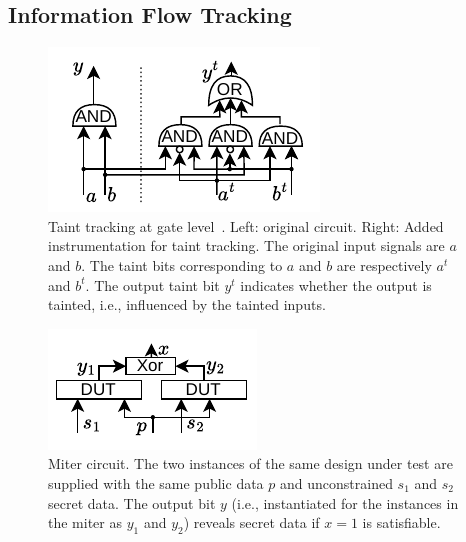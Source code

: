 \subsection{Information Flow Tracking}
\label{subsec:ift}

\begin{figure}[t]
    \begin{center}
    \includegraphics[width=0.5\columnwidth]{figures/glift/glift.pdf}
    \end{center}
    \vspace*{-1em}
    \caption{\label{fig:glift} Taint tracking at gate level~\cite{tiwari2009complete}. Left: original circuit. Right: Added instrumentation for taint tracking. The original input signals are $a$ and $b$. The taint bits corresponding to $a$ and $b$ are respectively $a^t$ and $b^t$. The output taint bit $y^t$ indicates whether the output is tainted, i.e., influenced by the tainted inputs.}
    \vspace*{-1em}
\end{figure}

\begin{figure}[t]
    \begin{center}
    \includegraphics[width=0.5\columnwidth]{figures/miter/miter.pdf}
    \end{center}
    \vspace*{-2em}
    \caption{\label{fig:miter} Miter circuit. The two instances of the same design under test are supplied with the same public data $p$ and unconstrained $s_1$ and $s_2$ secret data. The output bit $y$ (i.e., instantiated for the instances in the miter as $y_1$ and $y_2$) reveals secret data if $x=1$ is satisfiable.}
\end{figure}

